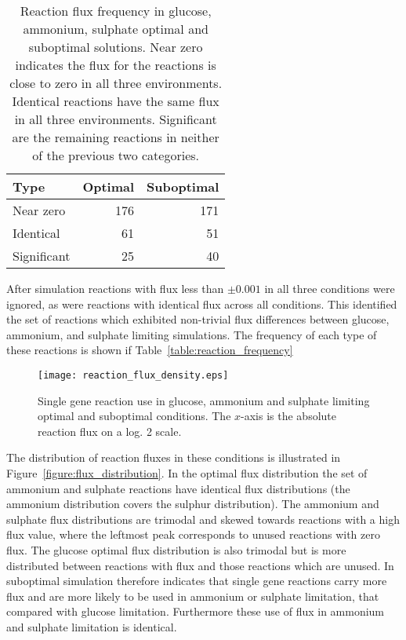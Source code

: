 \begin{table}%
  \centering
  \begin{tabular}{l r r}
                                          \toprule
    Type        & Optimal & Suboptimal \\ \midrule
    Near zero   & 176     & 171        \\
    Identical   & 61      & 51         \\
    Significant & 25      & 40         \\ \bottomrule
  \end{tabular}
  \caption[Reaction flux frequency across environments]{Reaction flux frequency in glucose, ammonium, sulphate optimal and suboptimal solutions. Near zero indicates the flux for the reactions is close to zero in all three environments. Identical reactions have the same flux in all three environments. Significant are the remaining reactions in neither of the previous two categories. }
  \label{table:reaction_frequency}
\end{table}%

After simulation reactions with flux less than $\pm0.001$ in all three conditions were ignored, as were reactions with identical flux across all conditions. This identified the set of reactions which exhibited non-trivial flux differences between glucose, ammonium, and sulphate limiting simulations. The frequency of each type of these reactions is shown if Table~\vref{table:reaction_frequency}

\begin{figure}%
  \centering
  \texttt{[image: reaction\_flux\_density.eps]}
  \caption[Single gene reaction use in glucose, ammonium and sulphate limitation]{Single gene reaction use in glucose, ammonium and sulphate limiting optimal and suboptimal conditions. The $x$-axis is the absolute reaction flux on a log. 2 scale. }
  \label{figure:flux_distribution}
\end{figure}%

The distribution of reaction fluxes in these conditions is illustrated in Figure~\vref{figure:flux_distribution}. In the optimal flux distribution the set of ammonium and sulphate reactions have identical flux distributions (the ammonium distribution covers the sulphur distribution). The ammonium and sulphate flux distributions are trimodal and skewed towards reactions with a high flux value, where the leftmost peak corresponds to unused reactions with zero flux. The glucose optimal flux distribution is also trimodal but is more distributed between reactions with flux and those reactions which are unused. In suboptimal simulation therefore indicates that single gene reactions carry more flux and are more likely to be used in ammonium or sulphate limitation, that compared with glucose limitation. Furthermore these use of flux in ammonium and sulphate limitation is identical.

